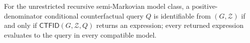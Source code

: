 For the unrestricted recursive semi-Markovian model class, a positive-denominator conditional counterfactual query \(Q\) is identifiable from \((G,\mathcal Z)\) if and only if \(\mathsf{CTFID}(G,\mathcal Z,Q)\) returns an expression; every returned expression evaluates to the query in every compatible model.